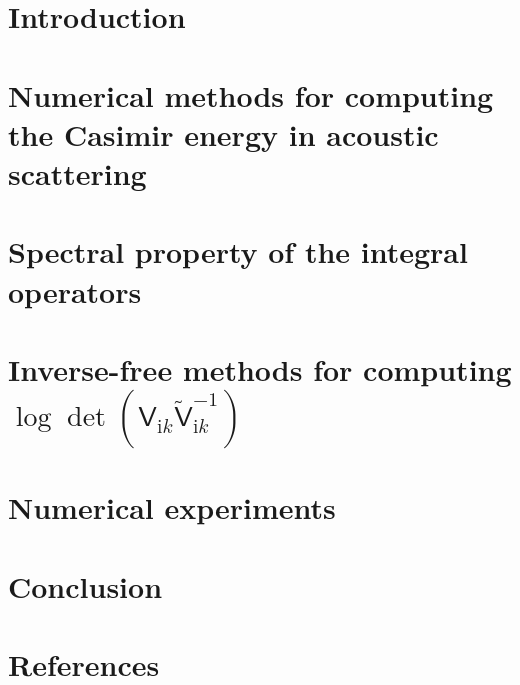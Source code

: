 \documentclass[review]{elsarticle}
\begin{document}
\section{Introduction}\label{Introduction}


\section{Numerical methods for computing the Casimir energy  in acoustic scattering}\label{Numerical methods for computing the Casimir energy}


\section{Spectral property of the integral operators}\label{Spectral property of the integral operators}


\section{Inverse-free methods for computing $\log\det(\mathsf{V}_{\mathrm{i}k}\tilde{\mathsf{V}}_{\mathrm{i}k}^{-1})$}\label{Krylov subspace for generalized eigenvalue problem}


\section{Numerical experiments}\label{Numerical experiments}


\section{Conclusion}\label{Conclusion}



\section*{References}


\end{document}
